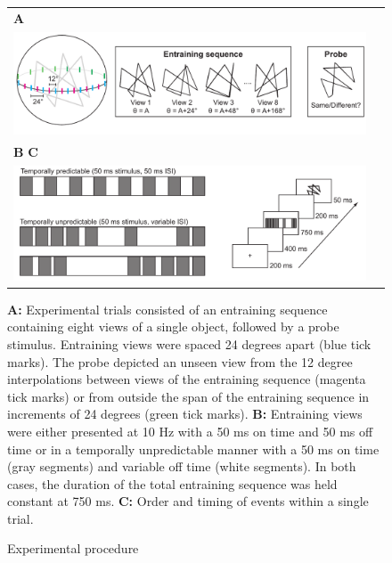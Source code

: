 \documentclass[dwyatte_dissertation.tex]{subfiles}
\begin{document}
\begin{figure}[h!]
\begin{center}
\begin{tabular}{ll}
\textbf{A} \\
\includegraphics[width=160mm]{figs/chap_pleast/paperclip_task.pdf} \\
\textbf{B} \hspace{90mm} \textbf{C} \\
\includegraphics[width=160mm]{figs/chap_pleast/paperclip_ISI.pdf} \\
\end{tabular}
\end{center}
\caption{Experimental procedure}{\textbf{A:} Experimental trials consisted of an entraining sequence containing eight views of a single object, followed by a probe stimulus. Entraining views were spaced 24 degrees apart (blue tick marks). The probe depicted an unseen view from the 12 degree interpolations between views of the entraining sequence (magenta tick marks) or from outside the span of the entraining sequence in increments of 24 degrees (green tick marks). \textbf{B:} Entraining views were either presented at 10 Hz with a 50 ms on time and 50 ms off time or in a temporally unpredictable manner with a 50 ms on time (gray segments) and variable off time (white segments). In both cases, the duration of the total entraining sequence was held constant at 750 ms. \textbf{C:} Order and timing  of events within a single trial.}
\label{fig:pleast_task}
\end{figure}
\end{document}
